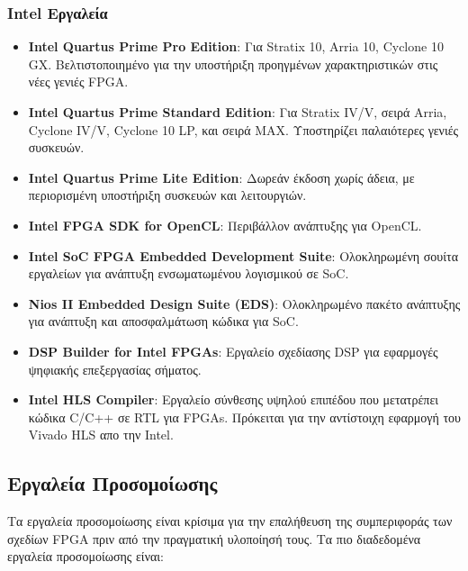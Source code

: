 \subsubsection{Intel Εργαλεία}
\begin{itemize}
  \item \textbf{Intel Quartus Prime Pro Edition}: Για Stratix 10, Arria 10, Cyclone 10 GX. Βελτιστοποιημένο για την υποστήριξη προηγμένων χαρακτηριστικών στις νέες γενιές FPGA.
  
  \item \textbf{Intel Quartus Prime Standard Edition}: Για Stratix IV/V, σειρά Arria, Cyclone IV/V, Cyclone 10 LP, και σειρά MAX. Υποστηρίζει παλαιότερες γενιές συσκευών.
  
  \item \textbf{Intel Quartus Prime Lite Edition}: Δωρεάν έκδοση χωρίς άδεια, με περιορισμένη υποστήριξη συσκευών και λειτουργιών.
  
  \item \textbf{Intel FPGA SDK for OpenCL}: Περιβάλλον ανάπτυξης για OpenCL.
  
  \item \textbf{Intel SoC FPGA Embedded Development Suite}: Ολοκληρωμένη σουίτα εργαλείων για ανάπτυξη ενσωματωμένου λογισμικού σε SoC.
  
  \item \textbf{Nios II Embedded Design Suite (EDS)}: Ολοκληρωμένο πακέτο ανάπτυξης για ανάπτυξη και αποσφαλμάτωση κώδικα για SoC.
  
  \item \textbf{DSP Builder for Intel FPGAs}: Εργαλείο σχεδίασης DSP για εφαρμογές ψηφιακής επεξεργασίας σήματος.
  
  \item \textbf{Intel HLS Compiler}: Εργαλείο σύνθεσης υψηλού επιπέδου που μετατρέπει κώδικα C/C++ σε RTL για FPGAs. Πρόκειται για την αντίστοιχη εφαρμογή του Vivado HLS απο την Intel.
\end{itemize}


\subsection{Εργαλεία Προσομοίωσης}

Τα εργαλεία προσομοίωσης είναι κρίσιμα για την επαλήθευση της συμπεριφοράς των σχεδίων FPGA πριν από την πραγματική υλοποίησή τους. Τα πιο διαδεδομένα εργαλεία προσομοίωσης είναι:

